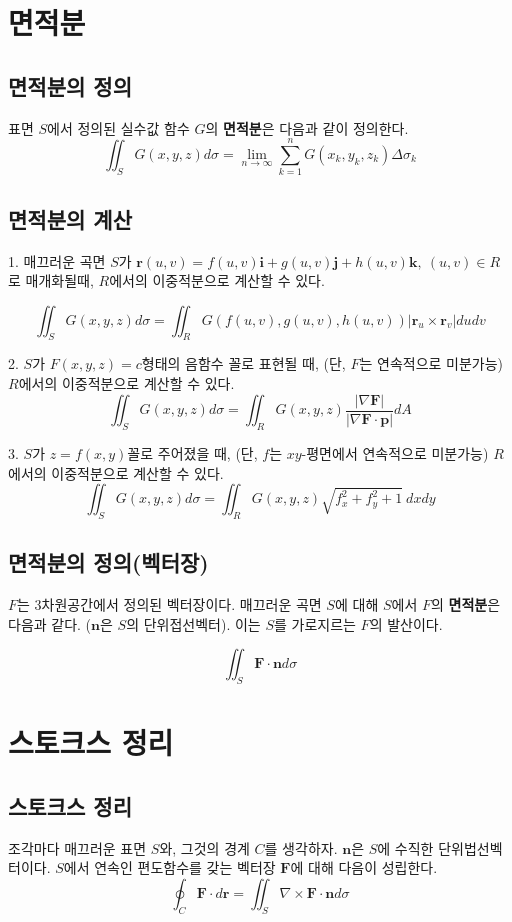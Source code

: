 \documentclass[chapter, oneside]{oblivoir}
\newcommand{\term}[1]{\textbf{#1}}
\begin{document}
\section{면적분}
\subsection{면적분의 정의}
표면 $S$에서 정의된 실수값 함수 $G$의 \term{면적분}은 다음과 같이 정의한다.
$$ \iint_S G(x,y,z) d\sigma = \lim_{n \to \infty}\sum_{k=1}^{n} G(x_k , y_k , z_k ) \Delta \sigma_k $$
\subsection{면적분의 계산}
1. 매끄러운 곡면 $S$가 $\textbf{r}(u,v) = f(u,v)\textbf{i}+g(u,v)\textbf{j}+h(u,v)\textbf{k},\ (u,v) \in R$로 매개화될때, $R$에서의 이중적분으로 계산할 수 있다.

$$ \iint_S G(x,y,z) d\sigma = \iint_R G(f(u,v), g(u,v), h(u,v))\left| \textbf{r}_u \times \textbf{r}_v \right| du dv $$

2. $S$가 $F(x,y,z)=c$형태의 음함수 꼴로 표현될 때, (단, $F$는 연속적으로 미분가능) $R$에서의 이중적분으로 계산할 수 있다.
$$ \iint_S G(x,y,z) d\sigma = \iint_R G(x,y,z) \frac{\left| \nabla \textbf{F} \right|}{\left| \nabla \textbf{F} \cdot \textbf{p} \right|} dA $$

3. $S$가 $z=f(x,y)$꼴로 주어졌을 때, (단, $f$는 $xy$-평면에서 연속적으로 미분가능)  $R$에서의 이중적분으로 계산할 수 있다.
$$ \iint_S G(x,y,z) d\sigma = \iint_R G(x,y,z) \sqrt{f_x^2 + f_y^2 + 1} \ dx dy $$

\subsection{면적분의 정의(벡터장)}
$F$는 3차원공간에서 정의된 벡터장이다. 매끄러운 곡면 $S$에 대해 $S$에서 $F$의 \term{면적분}은 다음과 같다. ($\textbf{n}$은 $S$의 단위접선벡터). 이는 $S$를 가로지르는 $F$의 발산이다.

$$ \iint_S \textbf{F} \cdot \textbf{n} d\sigma$$


\section{스토크스 정리}
\subsection{스토크스 정리}
조각마다 매끄러운 표면 $S$와, 그것의 경계 $C$를 생각하자. $\textbf{n}$은 $S$에 수직한 단위법선벡터이다. $S$에서 연속인 편도함수를 갖는 벡터장 $\textbf{F}$에 대해 다음이 성립한다.
$$\oint_C \textbf{F} \cdot d\textbf{r} = \iint_S \nabla \times \textbf{F} \cdot \textbf{n} d\sigma $$
\end{document}
